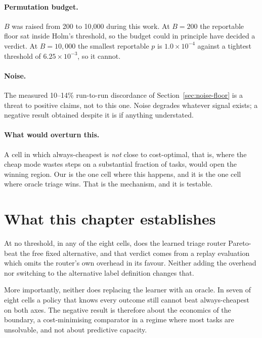 \paragraph{Permutation budget.} $B$ was raised from 200 to 10{,}000 during this
work. At $B=200$ the reportable floor sat inside Holm's threshold, so the budget
could in principle have decided a verdict. At $B=10{,}000$ the smallest
reportable $p$ is $1.0\times10^{-4}$ against a tightest threshold of
$6.25\times10^{-3}$, so it cannot.

\paragraph{Noise.} The measured 10--14\% run-to-run discordance of
Section~\ref{sec:noise-floor} is a threat to positive claims, not to this one.
Noise degrades whatever signal exists; a negative result obtained despite it is
if anything understated.

\paragraph{What would overturn this.} A cell in which always-cheapest is \emph{not} close to cost-optimal, that is, where the cheap mode wastes steps on a substantial fraction of tasks, would open the winning region. Our
 is the one cell where this happens, and it is the one cell
where oracle triage wins. That is the mechanism, and it is testable.

\FloatBarrier
\section{What this chapter establishes}
\label{sec:ch6-summary}

At no threshold, in any of the eight cells, does the learned triage router Pareto-beat the free fixed alternative, and that verdict comes from a replay evaluation which omits the router's own overhead in its favour. Neither adding the overhead nor switching to the alternative label definition changes that.

More importantly, neither does replacing the learner with an oracle. In seven of
eight cells a policy that knows every outcome still cannot beat always-cheapest
on both axes. The negative result is therefore about the economics of the boundary, a cost-minimising comparator in a regime where most tasks are unsolvable, and not about predictive capacity.


